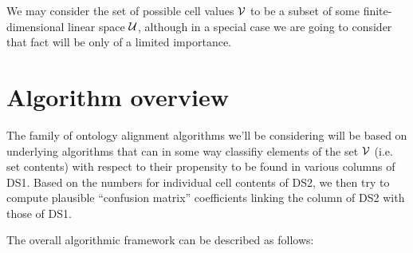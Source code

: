 \documentclass[12pt]{article}
\begin{document}
We may consider the set of possible cell values $\cal{V}$ to be a
subset of some finite-dimensional linear space $\cal{U}$, although in
a special case we are going to consider that fact will be only of a
limited importance.

\section{Algorithm overview}
\label{sec:overview}

The family of ontology alignment algorithms we'll be considering will
be based on underlying algorithms that can in some way classifiy
elements of the set $\cal{V}$ (i.e. set contents) with respect to
their propensity to be found in various columns of DS1. Based on the
numbers for individual cell contents of DS2, we then try to compute
plausible ``confusion matrix'' coefficients linking the column of DS2
with those of DS1.

The overall algorithmic framework can be described as follows:
\end{document}
